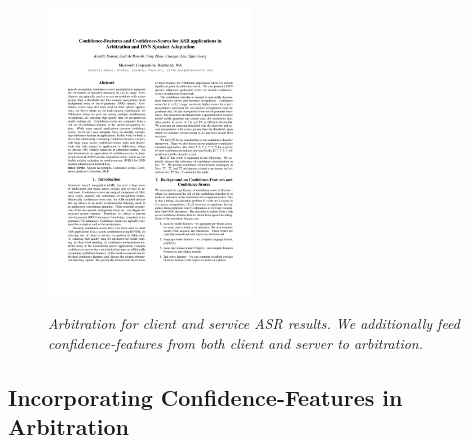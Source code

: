 \begin{figure}[h]
\centering
{\includegraphics[width=0.48\textwidth]{Arbitration}}
\caption{\it Arbitration for client and service ASR results. We additionally feed confidence-features from both client and server to arbitration.}
\label{Fig:Arbitration}
\end{figure}

\subsection{Incorporating Confidence-Features in Arbitration}

